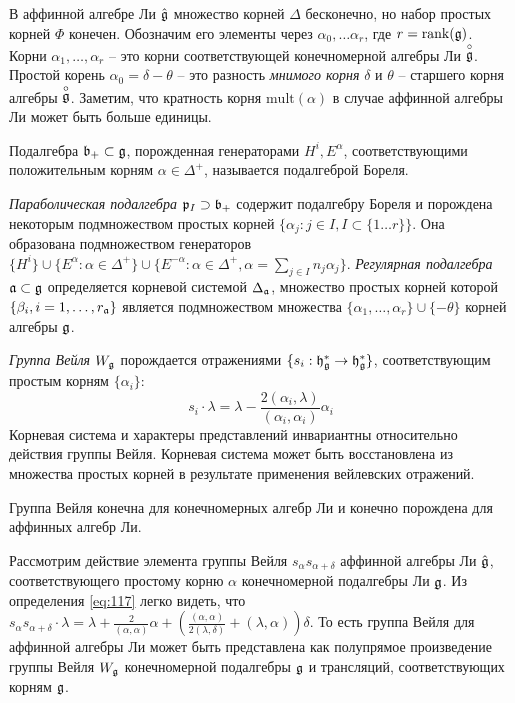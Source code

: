 В аффинной алгебре Ли  $\hat{\mathfrak{g}}$ множество корней  $\Delta$ бесконечно, но набор простых корней  $\Phi$ конечен. Обозначим его элементы через $\alpha_{0},\dots \alpha_{r}$, где $r=\mathrm{rank}(\mathfrak{g})$. Корни $\alpha_1,\dots, \alpha_r$ -- это корни соответствующей конечномерной алгебры Ли $\stackrel{\circ }{\mathfrak{g}}$. Простой корень  $\alpha_0=\delta-\theta$ -- это разность  {\it мнимого корня} $\delta$ и $\theta$ -- старшего корня алгебры $\stackrel{\circ }{\mathfrak{g}}$.
Заметим, что кратность корня  $\mathrm{mult}(\alpha)$ в случае аффинной алгебры Ли может быть больше единицы.

Подалгебра  $\mathfrak{b}_{+}\subset \mathfrak{g}$, порожденная генераторами $H^{i}, E^{\alpha}$, соответствующими положительным корням $\alpha\in \Delta^{+}$, называется подалгеброй Бореля.

{\it Параболическая подалгебра}  $\mathfrak{p}_{I}\supset \mathfrak{b}_{+}$ содержит подалгебру Бореля и порождена некоторым подмножеством простых корней  $\{\alpha_{j}:j\in I, I\subset \{1\dots r\}\}$. Она образована подмножеством генераторов  $\{H^{i}\}\cup \{E^{\alpha}:\alpha\in \Delta^{+}\}\cup \{E^{-\alpha}: \alpha\in\Delta^{+}, \alpha=\sum_{j\in I} n_{j} \alpha_{j}\}$.
{\it Регулярная подалгебра} $\mathfrak{a}\subset\mathfrak{g}$ определяется корневой системой  $\Delta_{\mathfrak{a}}$, множество простых корней которой  $\{\beta_{i}, i=1,\dots,r_{\mathfrak{a}}\}$ является подмножеством множества $\{\alpha_{1},\dots,\alpha_{r}\}\cup \{-\theta\}$ корней алгебры $\mathfrak{g}$.

 {\it Группа Вейля} $W_{\mathfrak{g}}$ порождается отражениями $\{s_{i}:\mathfrak{h}_{\mathfrak{g}}^{*}\to\mathfrak{h}_{\mathfrak{g}}^{*}\}$, соответствующим простым корням $\{\alpha_{i}\}$:
\begin{equation}
  \label{eq:117}
  s_{i}\cdot\lambda=\lambda-\frac{2(\alpha_{i},\lambda)}{(\alpha_{i},\alpha_{i})}\alpha_{i}
\end{equation}
Корневая система и характеры представлений инвариантны относительно действия группы Вейля. Корневая система может быть восстановлена из множества простых корней в результате применения вейлевских отражений.

Группа Вейля конечна для конечномерных алгебр Ли и конечно порождена для аффинных алгебр Ли.

Рассмотрим действие элемента группы Вейля $s_{\alpha}s_{\alpha+\delta}$ аффинной алгебры Ли   $\hat{\mathfrak{g}}$, соответствующего простому корню  $\alpha$ конечномерной подалгебры Ли $\mathfrak{g}$. Из определения  \eqref{eq:117} легко видеть, что $s_{\alpha}s_{\alpha+\delta} \cdot \lambda=\lambda+\frac{2}{(\alpha,\alpha)}\alpha+\left(\frac{(\alpha,\alpha)}{2 (\lambda,\delta)}+(\lambda,\alpha)\right) \delta$. То есть группа Вейля для аффинной алгебры Ли может быть представлена как полупрямое произведение группы Вейля $W_{\mathfrak{g}}$ конечномерной подалгебры  $\mathfrak{g}$ и трансляций, соответствующих корням $\mathfrak{g}$. 

